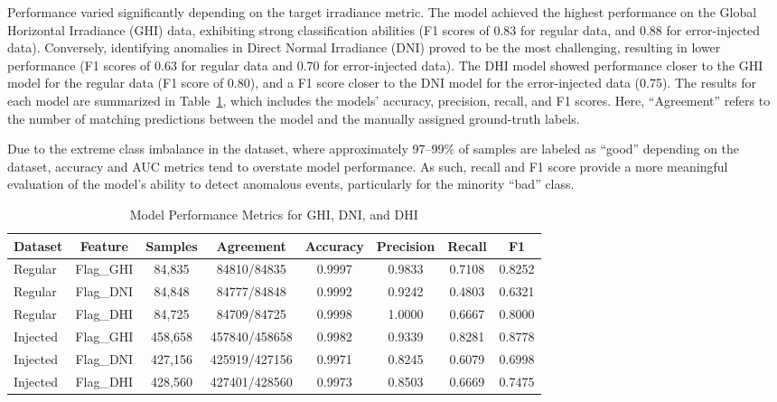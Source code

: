\documentclass[12pt]{article}
\begin{document}
Performance varied significantly depending on the target irradiance metric. The model achieved the highest performance on the Global Horizontal Irradiance (GHI) data, exhibiting strong classification abilities (F1 scores of 0.83 for regular data, and 0.88 for error-injected data). Conversely, identifying anomalies in Direct Normal Irradiance (DNI) proved to be the most challenging, resulting in lower performance (F1 scores of 0.63 for regular data and 0.70 for error-injected data). The DHI model showed performance closer to the GHI model for the regular data (F1 score of 0.80), and a F1 score closer to the DNI model for the error-injected data (0.75). The results for each model are summarized in Table~\ref{tab:model_performance}, which includes the models' accuracy, precision, recall, and F1 scores. Here, ``Agreement'' refers to the number of matching predictions between the model and the manually assigned ground-truth labels.

Due to the extreme class imbalance in the dataset, where approximately 97--99\% of samples are labeled as ``good'' depending on the dataset, accuracy and AUC metrics tend to overstate model performance. As such, recall and F1 score provide a more meaningful evaluation of the model's ability to detect anomalous events, particularly for the minority ``bad'' class.

\begin{table}[H]
    \centering
    \caption{Model Performance Metrics for GHI, DNI, and DHI}\label{tab:model_performance}
    \begin{tabular}{lccccccc}
        \toprule
        Dataset & Feature & Samples & Agreement & Accuracy & Precision & Recall & F1 \\
        \midrule
        Regular & Flag\_GHI & 84,835 & 84810/84835 & 0.9997 & 0.9833 & 0.7108 & 0.8252 \\ 
        Regular & Flag\_DNI & 84,848 & 84777/84848 & 0.9992 & 0.9242 & 0.4803 & 0.6321 \\
        Regular & Flag\_DHI & 84,725 & 84709/84725 & 0.9998 & 1.0000 & 0.6667 & 0.8000 \\
        \midrule 
        Injected & Flag\_GHI & 458,658 & 457840/458658 & 0.9982 & 0.9339 & 0.8281 & 0.8778 \\
        Injected & Flag\_DNI & 427,156 & 425919/427156 & 0.9971 & 0.8245 & 0.6079 & 0.6998 \\
        Injected & Flag\_DHI & 428,560 & 427401/428560 & 0.9973 & 0.8503 & 0.6669 & 0.7475 \\
        \bottomrule
    \end{tabular}
\end{table}
\end{document}
